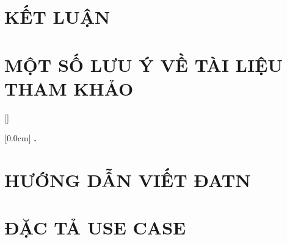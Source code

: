\documentclass[a4paper,13pt,3p,twoside]{report}
\renewcommand{\bibname}{Danh_sach_tai_lieu_tham_khao}
\theoremstyle{definition}
\begin{document}
\newpage
\chapter{KẾT LUẬN}


\newpage
\chapter*{MỘT SỐ LƯU Ý VỀ TÀI LIỆU THAM KHẢO} %
\label{chapter:reference}


\newpage
\renewcommand\bibname{TÀI LIỆU THAM KHẢO}
\printbibliography
{}

\appendixpage
\appendix
\addappheadtotoc

[]
\titlespacing*{\chapter}{0pt}{-20pt}{20pt}

    [0.0cm]             %
    {\bfseries\vspace{0.3cm}}                  %
    {{\bfseries{\scshape} \thecontentslabel.\ }} %
    {}         %
    {\contentspage} 
    
\chapter{HƯỚNG DẪN VIẾT ĐATN}


\newpage
\chapter{ĐẶC TẢ USE CASE}

\end{document}

